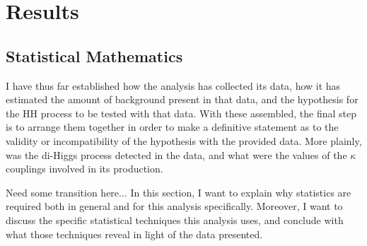 \chapter{Results} \label{chapter:results}

%
%
%
%
%
%
%
%        
%
%

\section{Statistical Mathematics}

    I have thus far established how the analysis has collected its data,
        how it has estimated the amount of background present in that data,
        and the hypothesis for the HH process to be tested with that data.
    With these assembled, the final step is to arrange them together in order to make a definitive statement
        as to the validity or incompatibility of the hypothesis with the provided data.
    More plainly, was the di-Higgs process detected in the data,
        and what were the values of the $\kappa$ couplings involved in its production.

    Need some transition here...
    In this section, I want to explain why statistics are required
        both in general and for this analysis specifically.
    Moreover, I want to discuss the specific statistical techniques this analysis uses,
        and conclude with what those techniques reveal in light of the data presented.

